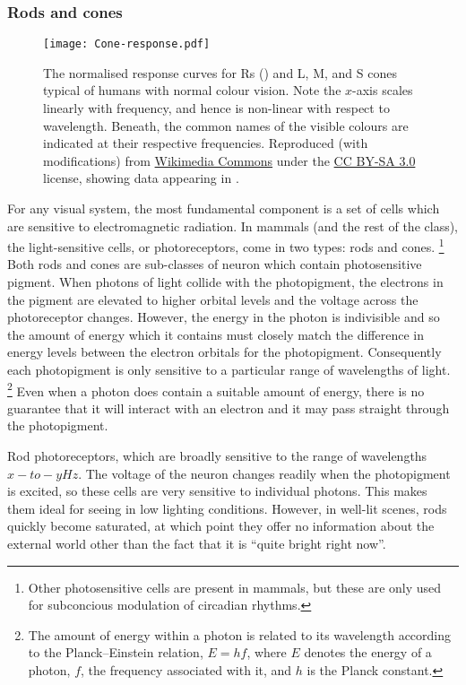 \subsubsection{Rods and cones}

\begin{figure}[htbp]
\centering
\texttt{[image: Cone-response.pdf]}
\caption{
The normalised response curves for \aclp{R} () and \acf{L}, \acf{M}, and \acf{S} cones typical of humans with normal colour vision.
Note the $x$-axis scales linearly with frequency, and hence is non-linear with respect to wavelength.
Beneath, the common names of the visible colours are indicated at their respective frequencies.
Reproduced (with modifications) from \href{https://commons.wikimedia.org/wiki/File:Cone-response.svg}{Wikimedia Commons} under the \href{https://creativecommons.org/licenses/by-sa/3.0/deed.en}{CC BY-SA 3.0} license, showing data appearing in \citet{Bowmaker1980}.
}
\label{fig:bg_cone_responses}
\end{figure}

For any visual system, the most fundamental component is a set of cells which are sensitive to electromagnetic radiation.
In mammals (and the rest of the class), the light-sensitive cells, or photoreceptors, come in two types: rods and cones.%
\footnote{Other photosensitive cells are present in mammals, but these are only used for subconcious modulation of circadian rhythms.}
Both rods and cones are sub-classes of neuron which contain photosensitive pigment.
When photons of light collide with the photopigment, the electrons in the pigment are elevated to higher orbital levels and the voltage across the photoreceptor changes.
However, the energy in the photon is indivisible and so the amount of energy which it contains must closely match the difference in energy levels between the electron orbitals for the photopigment.
Consequently each photopigment is only sensitive to a particular range of wavelengths of light.%
\footnote{The amount of energy within a photon is related to its wavelength according to the Planck--Einstein relation,
$E = h f$, where $E$ denotes the energy of a photon, $f$, the frequency associated with it, and $h$ is the Planck constant.%
}
Even when a photon does contain a suitable amount of energy, there is no guarantee that it will interact with an electron and it may pass straight through the photopigment.

Rod photoreceptors, which are broadly sensitive to the range of wavelengths $x-to-yHz$.
The voltage of the neuron changes readily when the photopigment is excited, so these cells are very sensitive to individual photons.
This makes them ideal for seeing in low lighting conditions.
However, in well-lit scenes, rods quickly become saturated, at which point they offer no information about the external world other than the fact that it is ``quite bright right now''.

